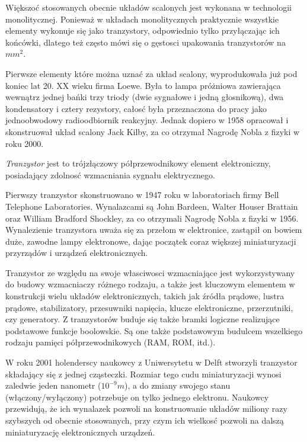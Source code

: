 \documentclass[a4paper,11pt]{article}
\begin{document}
 Większoć stosowanych obecnie układów scalonych jest wykonana w technologii monolitycznej. Ponieważ w układach monolitycznych praktycznie wszystkie elementy wykonuje się jako tranzystory, odpowiednio tylko przyłączając ich końcówki, dlatego też często mówi się o gęstosci upakowania tranzystorów na $mm^2$.

 Pierwsze elementy które można uznać za układ scalony, wyprodukowała już pod koniec lat 20. XX wieku firma Loewe. Była to lampa próżniowa zawierająca wewnątrz jednej bańki trzy triody (dwie sygnałowe i jedną głosnikową), dwa kondensatory i cztery rezystory, całosć była przeznaczona do pracy jako jednoobwodowy radioodbiornik reakcyjny. Jednak dopiero w 1958 opracował i skonstruował układ scalony Jack Kilby, za co otrzymał Nagrodę Nobla z fizyki w roku 2000.

 \emph{Tranzystor} jest to trójzłączowy półprzewodnikowy element elektroniczny, posiadający zdolnosć wzmacniania sygnału elektrycznego.  

Pierwszy tranzystor skonstruowano w 1947 roku w laboratoriach firmy Bell Telephone Laboratories. Wynalazcami są John Bardeen, Walter Houser Brattain oraz William Bradford Shockley, za co otrzymali Nagrodę Nobla z fizyki w 1956. Wynalezienie tranzystora uważa się za przełom w elektronice, zastąpił on bowiem duże, zawodne lampy elektronowe, dając początek coraz większej miniaturyzacji przyrządów i urządzeń elektronicznych. 

Tranzystor ze względu na swoje własciwosci wzmacniające jest  wykorzystywany do budowy wzmacniaczy różnego rodzaju, a także jest kluczowym elementem w konstrukcji wielu układów elektronicznych, takich jak źródła prądowe, lustra prądowe, stabilizatory, przesuwniki napięcia, klucze elektroniczne, przerzutniki, czy generatory. Z tranzystorów buduje się także bramki logiczne realizujące podstawowe funkcje boolowskie. Są one także podstawowym budulcem wszelkiego rodzaju pamięci półprzewodnikowych (RAM, ROM, itd.).

 W roku 2001 holenderscy naukowcy z Uniwersytetu w Delft stworzyli tranzystor składający się z jednej cząsteczki. Rozmiar tego cudu miniaturyzacji wynosi zaledwie jeden nanometr ($10^{-9}m$), a do zmiany swojego stanu (włączony/wyłączony) potrzebuje on tylko jednego elektronu. Naukowcy przewidują, że ich wynalazek pozwoli na konstruowanie układów miliony razy szybszych od obecnie stosowanych, przy czym ich wielkosć pozwoli na dalszą miniaturyzację elektronicznych urządzeń. 
\end{document}
